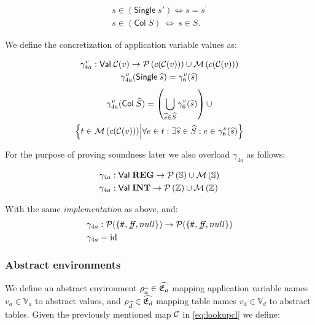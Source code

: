 \begin{align}
    s \in (\mathsf{Single} \; s') \iff s = s^\prime \\
    s \in (\mathsf{Col} \; S) \ \iff \ s \in S.
\end{align}


We define the concretization of application variable values as:


\begin{gather}
    \gamma^v_{4a} : \mathsf{Val} \; \mathcal{C}(v) \rightarrow \mathcal{P}\left(c(\mathcal{C}(v))\right) \cup \mathcal{M}\left(c(\mathcal{C}(v))\right) \\
    \gamma^v_{4a}(\mathsf{Single} \; \widehat{s}) = \gamma^v_6(\widehat{s})
\end{gather}
\begin{multline}
    \gamma^v_{4a}(\mathsf{Col} \; \widehat{S}) = \left( \bigcup_{\widehat{s} \in \widehat{S}} \gamma^v_6(\widehat{s}) \right) \cup \\
    \left\{ t \in \mathcal{M}\left(c(\mathcal{C}(v))\right)\middle| \forall e \in t : \exists \widehat{s} \in \widehat{S} : e \in \gamma^v_6(\widehat{s}) \right\}
\end{multline}


For the purpose of proving soundness later we also overload $\gamma_{4a}$ as follows:


\begin{align}
    \gamma_{4a} &: \mathsf{Val} \; \mathbf{REG} \rightarrow \mathcal{P}\left(\mathbb{S}\right) \cup \mathcal{M}\left(\mathbb{S}\right) \\
    \gamma_{4a} &: \mathsf{Val} \; \mathbf{INT} \rightarrow \mathcal{P}\left(\mathbb{Z}\right) \cup \mathcal{M}\left(\mathbb{Z}\right)
\end{align}

With the same \emph{implementation} as above, and:
\begin{align}
    \gamma_{4a} &: \mathcal{P}(\{t\!t, f\!\!f, null\}) \rightarrow \mathcal{P}(\{t\!t, f\!\!f, null\}) \\
    \gamma_{4a} &= \mathrm{id}
\end{align}



\subsubsection{Abstract environments}\label{subsubsec:absenv}
We define an abstract environment $\rho_{\widehat{a}} \in \widehat{\mathfrak{E}_a}$ mapping application variable names $v_a \in \mathbb{V}_a$ to abstract values, and $\rho_{\widehat{d}} \in \widehat{\mathfrak{E}_d}$ mapping table names $v_d \in \mathbb{V}_d$ to abstract tables.
Given the previously mentioned map $\mathcal{C}$ in \autoref{eq:lookupcl} we define:


